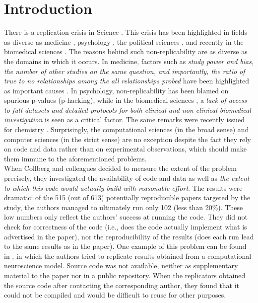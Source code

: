 \documentclass[a4paper,10pt, twocolumn]{article}
\begin{document}
\section*{Introduction}
There is a replication crisis in Science \citep{Baker:2016, Munaf:2017}. This
crisis has been highlighted in fields as diverse as medicine
\citep{ioannidis:2005}, psychology \citep{nosek:2015}, the political sciences
\citep{janz:2015}, and recently in the biomedical sciences
\citep{iqbal:2016}. The reasons behind such non-replicability are as diverse as
the domains in which it occurs.  In medicine, factors such as {\em study power
  and bias, the number of other studies on the same question, and importantly,
  the ratio of true to no relationships among the all relationships probed}
have been highlighted as important causes \citep{ioannidis:2005}.  In
psychology, non-replicability has been blamed on spurious p-values (p-hacking),
while in the biomedical sciences \citep{iqbal:2016}, a {\em lack of access to
  full datasets and detailed protocols for both clinical and non-clinical
  biomedical investigation} is seen as a critical factor.  The same remarks
were recently issued for chemistry \citep{coudert:2017}.  Surprisingly, the
computational sciences (in the broad sense) and computer sciences (in the
strict sense) are no exception \citep{donoho:2009,Manninen:2017} despite the
fact they rely on code and data rather than on experimental observations, which
should make them immune to the aforementioned problems.\\

When Collberg and colleagues \citep{collberg:2014, collberg:2015} decided to measure the extent of the problem
precisely, they investigated the availability of code and data as well as {\em the extent to which this code would actually build with reasonable
  effort}. The results were dramatic: of the 515 (out of 613) potentially reproducible
papers targeted by the study, the authors managed to ultimately run
only 102 (less than 20\%).
These low numbers only reflect the authors' success at running the code.
They did not check for correctness of the code (i.e., does the code actually implement what is advertised in the paper), nor the reproducibility of the results (does each run lead to the same results as in the paper).
One example of this problem can be found in \citet{topalidou:2015a}, in which the authors tried to replicate results obtained from a computational neuroscience model.
Source code was not available, neither as supplementary material to the paper nor in a public repository.
When the replicators obtained the source code after contacting the corresponding author, they found that it could not be compiled and would be difficult to reuse for other purposes.\\
\end{document}

